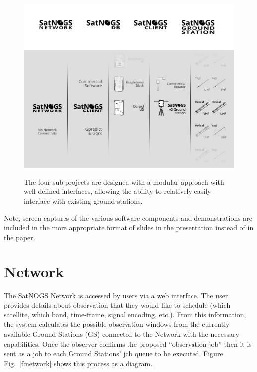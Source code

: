 \documentclass[conference,12pt]{IEEEtran}
\newcommand{\figref}[1]{Fig.~\ref{#1}}
\newlength{\figwidth}
\begin{document}
\begin{figure}[htbp]
\centering
\includegraphics[width=\figwidth]{fig/four-components-titles-invert}
\includegraphics[width=\figwidth]{fig/modular-options}
\caption{The four sub-projects are designed with a modular approach with well-defined interfaces, allowing the ability to relatively easily interface with existing ground stations.}
\label{f:modular}
\end{figure}

Note, screen captures of the various software components and demonstrations are included in the more appropriate format of slides in the presentation instead of in the paper.


\section{Network}
The SatNOGS Network is accessed by users via a web interface.
The user provides details about observation that they would like to schedule (which satellite, which band, time-frame, signal encoding, etc.).
From this information, the system calculates the possible observation windows from the currently available Ground Stations (GS) connected to the Network with the necessary capabilities.
Once the observer confirms the proposed ``observation job'' then it is sent as a job to each Ground Stations' job queue to be executed.
Figure \figref{f:network} shows this process as a diagram.
\end{document}
